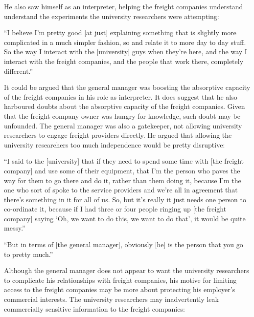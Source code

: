 He also saw himself as an interpreter, helping the freight companies understand understand the experiments the university researchers were attempting: 

\begin{displayquote}[Participant 1/1]
\small
\enquote{I believe I'm pretty good [at just] explaining something that is slightly more complicated in a much simpler fashion, so and relate it to more day to day stuff. So the way I interact with the [university] guys when they're here, and the way I interact with the freight companies, and the people that work there, completely different.} 
\end{displayquote}
 

It could be argued that the general manager was boosting the absorptive capacity of the freight companies in his role as interpreter. It does suggest that he also harboured doubts about the absorptive capacity of the freight companies. Given that the freight company owner was hungry for knowledge, such doubt may be unfounded. The general manager was also a gatekeeper, not allowing university researchers to engage freight providers directly. He argued that allowing the university researchers too much independence would be pretty disruptive: 

\begin{displayquote}[Participant 1/1]
\small
\enquote{I said to the [university] that if they need to spend some time with [the freight company] and use some of their equipment, that I'm the person who paves the way for them to go there and do it, rather than them doing it, because I'm the one who sort of spoke to the service providers and we’re all in agreement that there's something in it for all of us. So, but it's really it just needs one person to co-ordinate it, because if I had three or four people ringing up [the freight company] saying \enquote{Oh, we want to do this, we want to do that}, it would be quite messy.} 
\end{displayquote}
 

\begin{displayquote}[Participant 15/1]
\small
\enquote{But in terms of [the general manager], obviously [he] is the person that you go to pretty much.} 
\end{displayquote}
 

Although the general manager does not appear to want the university researchers to complicate his relationships with freight companies, his motive for limiting access to the freight companies may be more about protecting his employer's commercial interests. The university researchers may inadvertently leak commercially sensitive information to the freight companies:

